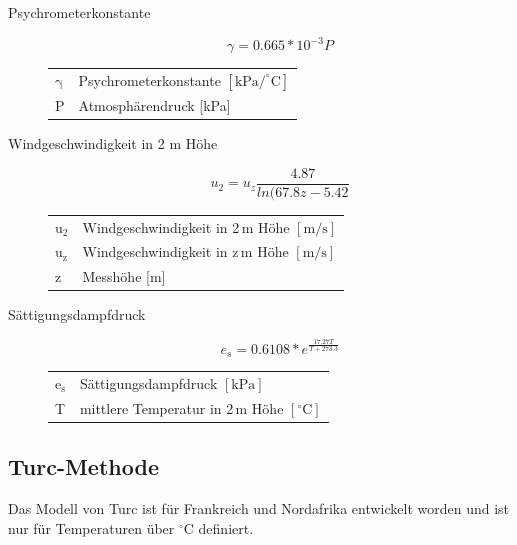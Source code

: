 \begin{description}
\item[Psychrometerkonstante]
\begin{equation}
\label{eq:gamma}
\gamma=0.665*10^{-3} P
\end{equation}
\begin{table}[H]
\centering
\begin{tabular}{ll}
$\mathrm{\gamma}$ & Psychrometerkonstante $\mathrm{[kPa/^{\circ}C]}$\\
P & Atmosphärendruck [kPa]\\
\end{tabular}
\end{table}

\item[Windgeschwindigkeit in 2 m Höhe]
\begin{equation}
\label{eq:u2}
u_2=u_z\frac{4.87}{ln(67.8z-5.42}
\end{equation}
\begin{table}[H]
\centering
\begin{tabular}{ll}
$\mathrm{u_2}$ & Windgeschwindigkeit in 2\,m Höhe $\mathrm{[m/s]}$\\
$\mathrm{u_z}$ & Windgeschwindigkeit in z\,m Höhe $\mathrm{[m/s]}$\\
z & Messhöhe [m]\\
\end{tabular}
\end{table}

\item[Sättigungsdampfdruck]
\begin{equation}
\label{eq:es}
e_s=0.6108*e^{\frac{17.27T}{T+273.3}}
\end{equation}
\begin{table}[H]
\centering
\begin{tabular}{ll}
$\mathrm{e_s}$ & Sättigungsdampfdruck $\mathrm{[kPa]}$\\
T & mittlere Temperatur in 2\,m Höhe $\mathrm{[^{\circ}C]}$\\\end{tabular}
\end{table}

\end{description}

\subsection{Turc-Methode}
Das Modell von Turc ist für Frankreich und Nordafrika entwickelt worden und ist nur für Temperaturen über $\mathrm{^{\circ}C}$ definiert.

